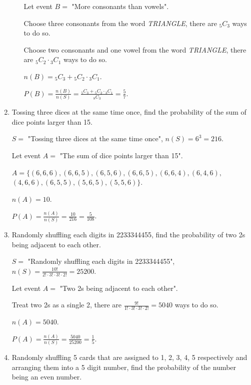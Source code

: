 \documentclass{report}
\newcommand\comb[2][^n]{{}_{#1}C_{#2}}
\begin{document}
\begin{multicols}{2}
\begin{enumerate}
\begin{enumerate}
                  Let event $B =$ "More consonants than vowels".

                  Choose three consonants from the word \textit{TRIANGLE}, there are
                  $\comb[5]{3}$ ways to do so.

                  Choose two consonants and one vowel from the word \textit{TRIANGLE}, there are
                  $\comb[5]{2} \cdot \comb[3]{1}$ ways to do so.

                  $n(B) = \comb[5]{3} + \comb[5]{2} \cdot \comb[3]{1}$.

                  $P(B) = \frac{n(B)}{n(S)} = \frac{\comb[5]{3} + \comb[5]{2} \cdot \comb[3]{1}}{\comb[8]{3}} = \frac{5}{7}$.
          \end{enumerate}

    \item Tossing three dices at the same time once, find the probability of the sum of
          dice points larger than 15. \sol{}

          $S =$ "Tossing three dices at the same time once", $n(S) = 6^3 = 216$.

          Let event $A =$ "The sum of dice points larger than 15".

          $A = \{ (6, 6, 6), (6, 6, 5), (6, 5, 6), (6, 6, 5), (6, 6, 4), (6, 4, 6), $
          $(4, 6, 6), (6, 5, 5), (5, 6, 5), (5, 5, 6)\}$.

          $n(A) = 10$.

          $P(A) = \frac{n(A)}{n(S)} = \frac{10}{216} = \frac{5}{108}$.

    \item Randomly shuffling each digits in 2233344455, find the probability of two 2s
          being adjacent to each other.

          \sol{}

          $S =$ "Randomly shuffling each digits in 2233344455", $n(S) = \frac{10!}{2! \cdot 3! \cdot 3! \cdot 2!} = 25200$.

          Let event $A =$ "Two 2s being adjacent to each other".

          Treat two 2s as a single 2, there are $\frac{9!}{1! \cdot 3! \cdot 3! \cdot 2!}
            = 5040$ ways to do so.

          $n(A) = 5040$.

          $P(A) = \frac{n(A)}{n(S)} = \frac{5040}{25200} = \frac{1}{5}$.

    \item Randomly shuffling 5 cards that are assigned to 1, 2, 3, 4, 5 respectively and
          arranging them into a 5 digit number, find the probability of the number being
          an even number.


\end{enumerate}
\end{multicols}
\end{document}
